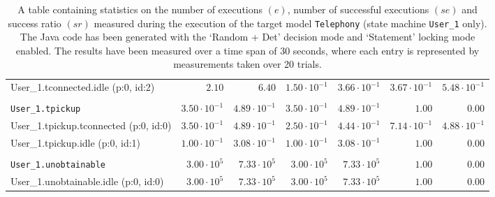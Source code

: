 \begin{table}[htbp]
{\begin{tabular}{lrrrrrr}
\hspace{3mm}User\_1.tconnected.idle (p:0, id:2)       &               $2.10$ &               $6.40$ & $1.50 \cdot 10^{-1}$ & $3.66 \cdot 10^{-1}$ & $3.67 \cdot 10^{-1}$ & $5.48 \cdot 10^{-1}$ \\
\\[-8pt]\texttt{User\_1.tpickup}                      & $3.50 \cdot 10^{-1}$ & $4.89 \cdot 10^{-1}$ & $3.50 \cdot 10^{-1}$ & $4.89 \cdot 10^{-1}$ &               $1.00$ &               $0.00$ \\
\hspace{3mm}User\_1.tpickup.tconnected (p:0, id:0)    & $3.50 \cdot 10^{-1}$ & $4.89 \cdot 10^{-1}$ & $2.50 \cdot 10^{-1}$ & $4.44 \cdot 10^{-1}$ & $7.14 \cdot 10^{-1}$ & $4.88 \cdot 10^{-1}$ \\
\hspace{3mm}User\_1.tpickup.idle (p:0, id:1)          & $1.00 \cdot 10^{-1}$ & $3.08 \cdot 10^{-1}$ & $1.00 \cdot 10^{-1}$ & $3.08 \cdot 10^{-1}$ &               $1.00$ &               $0.00$ \\
\\[-8pt]\texttt{User\_1.unobtainable}                 &  $3.00 \cdot 10^{5}$ &  $7.33 \cdot 10^{5}$ &  $3.00 \cdot 10^{5}$ &  $7.33 \cdot 10^{5}$ &               $1.00$ &               $0.00$ \\
\hspace{3mm}User\_1.unobtainable.idle (p:0, id:0)     &  $3.00 \cdot 10^{5}$ &  $7.33 \cdot 10^{5}$ &  $3.00 \cdot 10^{5}$ &  $7.33 \cdot 10^{5}$ &               $1.00$ &               $0.00$ \\
\bottomrule
\end{tabular}
}
\caption{A table containing statistics on the number of executions $(e)$, number of successful executions $(se)$ and success ratio $(sr)$ measured during the execution of the target model \texttt{Telephony} (state machine \texttt{User\_1} only). The Java code has been generated with the `Random + Det' decision mode and `Statement' locking mode enabled. The results have been measured over a time span of 30 seconds, where each entry is represented by measurements taken over 20 trials.}
\label{table:frequency_results_telephony_random_det_statement_user_1}
\end{table}